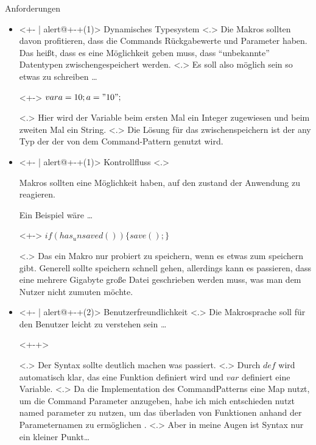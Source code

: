   \begin{frame}{Anforderungen}
    \begin{itemize}
      \item<+- | alert@+-+(1)>
        Dynamisches Typesystem
            \note[item]<.>{
              Die Makros sollten davon profitieren, dass die Commands Rückgabewerte und Parameter haben. Das heißt, dass es eine Möglichkeit geben muss, dass ``unbekannte'' Datentypen zwischengespeichert werden.
            }
            \note[item]<.>{
              Es soll also möglich sein so etwas zu schreiben \ldots
            }
        \begin{uncoverenv}<+->%
          \tabto{4.5cm}
          \myMIn$var a = 10; a = "10";$
        \end{uncoverenv}
            \note[item]<.>{
              Hier wird der Variable  beim ersten Mal ein Integer zugewiesen und beim zweiten Mal ein String.
            }
            \note[item]<.>{
              Die Lösung für das zwischenspeichern ist der any Typ der der von dem Command-Pattern genutzt wird.
            }
      \item<+- | alert@+-+(1)>
        Kontrollfluss
            \note[item]<.>{
              Makros sollten eine Möglichkeit haben, auf den zustand der Anwendung zu reagieren.

              Ein Beispiel wäre \ldots
            }
        \begin{uncoverenv}<+->%
          \tabto{4.5cm}
          \myMIn$if(has_unsaved()) \{ save(); \}$
        \end{uncoverenv}
            \note[item]<.>{
              Das ein Makro nur probiert zu speichern, wenn es etwas zum speichern gibt. Generell sollte speichern schnell gehen, allerdings kann es passieren, dass eine mehrere Gigabyte große Datei geschrieben werden muss, was man dem Nutzer nicht zumuten möchte.
            }
      \item<+- | alert@+-+(2)>
        Benutzerfreundlichkeit%
            \note[item]<.>{
              Die Makrosprache soll für den Benutzer leicht zu verstehen sein \ldots
            }
        \begin{uncoverenv}<+-+>%
          \begin{myInvBox}[width=.9\linewidth]
            
          \end{myInvBox}
          \vspace{-10em}
        \end{uncoverenv}
            \note[item]<.>{
              Der Syntax sollte deutlich machen was passiert.
            }
            \note[item]<.>{
              Durch \myMIn$def$ wird automatisch klar, das eine Funktion definiert wird und \myMIn$var$ definiert eine Variable.
            }
            \note[item]<.>{
              Da die Implementation des CommandPatterns eine Map nutzt, um die Command Parameter anzugeben, habe ich mich entschieden nutzt named parameter zu nutzen, um das überladen von Funktionen anhand der Parameternamen zu ermöglichen .
            }
            \note[item]<.>{
              Aber in meine Augen ist Syntax nur ein kleiner Punkt\ldots
            }


\end{itemize}
\end{frame}
